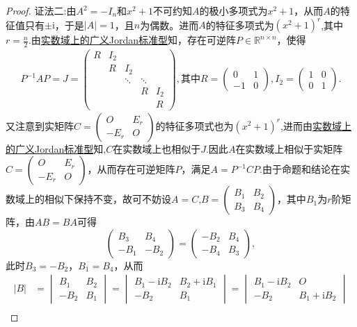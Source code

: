 \documentclass[../../main.tex]{subfiles}%
\begin{document}
\begin{proof}
{\color{blue} 证法二:}由\(A^2 = -I_n\)和\(x^2 + 1\)不可约知\(A\)的极小多项式为\(x^2 + 1\)，从而\(A\)的特征值只有\(\pm \mathrm{i}\)，于是\(|A| = 1\)，且\(n\)为偶数。进而\(A\)的特征多项式为\((x^2 + 1)^r\),其中$r=\frac{n}{2}$.由\hyperref[theorem:实数域上的广义Jordan标准型]{实数域上的广义Jordan标准型}知，存在可逆阵\(P \in \mathbb{R}^{n \times n}\)，使得
\begin{align*}
P^{-1}AP = J = \begin{pmatrix}
R & I_2 &  &  &  \\
 & R & I_2 &  &  \\
 &  & \ddots & \ddots &  \\
 &  &  & R & I_2 \\
 &  &  &  & R
\end{pmatrix},\text{其中}R = \begin{pmatrix} 0 & 1 \\ -1 & 0 \end{pmatrix},I_2 = \begin{pmatrix} 1 & 0 \\ 0 & 1 \end{pmatrix}.
\end{align*}
又注意到实矩阵$C = \begin{pmatrix} O & E_r \\ -E_r & O \end{pmatrix}$的特征多项式也为\((x^2 + 1)^r\),进而由\hyperref[theorem:实数域上的广义Jordan标准型]{实数域上的广义Jordan标准型}知,$C$在实数域上也相似于$J$.因此$A$在实数域上相似于实矩阵$C = \begin{pmatrix} O & E_r \\ -E_r & O \end{pmatrix}$，从而存在可逆矩阵$P$，满足$A = P^{-1}CP$.由于命题和结论在实数域上的相似下保持不变，故可不妨设$A=C$,$B = \begin{pmatrix} B_1 & B_2 \\ B_3 & B_4 \end{pmatrix}$，其中$B_1$为$r$阶矩阵，由$AB=BA$可得
$$
\begin{pmatrix} B_3 & B_4 \\ -B_1 & -B_2 \end{pmatrix} = \begin{pmatrix} -B_2 & B_4 \\ -B_4 & B_3 \end{pmatrix},
$$
此时$B_3 = -B_2$，$B_1 = B_4$，从而
\begin{align*}
|B| & = \begin{vmatrix} B_1 & B_2 \\ -B_2 & B_1 \end{vmatrix} = \begin{vmatrix} B_1 - \text{i}B_2 & B_2 + \text{i}B_1 \\ -B_2 & B_1 \end{vmatrix} = \begin{vmatrix} B_1 -  \text{i}B_2 & O \\ -B_2 & B_1 + \text{i}B_2 \end{vmatrix} \\

\end{align*}
\end{proof}
\end{document}
